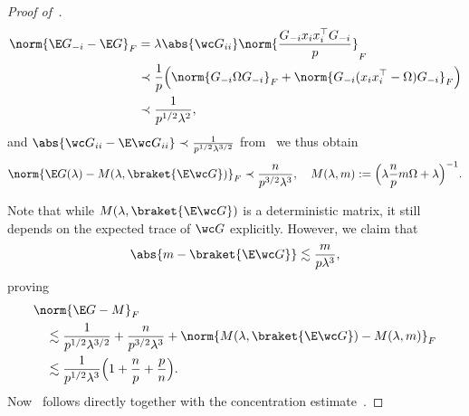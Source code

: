 \begin{proof}[Proof of~]
\begin{equation}
    \begin{aligned}
    \norm{\E G_{-i} - \E G}_F  &= \lambda\abs{\wc G_{ii}}\norm{\frac{G_{-i}x_i x_i^\top G_{-i}}{p}}_F \\
    &\prec \frac{1}{p}\Bigl(\norm{G_{-i}\Omega G_{-i}}_F + \norm{G_{-i} (x_ix_i^\top-\Omega)G_{-i} }_F\Bigr)\\
    &\prec \frac{1}{p^{1/2}\lambda^2},
    \end{aligned}
\end{equation}
and $\abs{\wc G_{ii}-\E \wc G_{ii}} \prec \frac{1}{p^{1/2}\lambda^{3/2}}$ from~
we thus obtain
\begin{equation}
    \norm{\E G(\lambda) - M(\lambda,\braket{\E\wc G})}_F \prec \frac{n}{p^{3/2}\lambda^3},\quad M(\lambda,m):=\Bigl( \lambda\frac{n}{p}m\Omega + \lambda\Bigr)^{-1}.
\end{equation}

Note that while $M(\lambda,\braket{\E \wc G})$ is a deterministic matrix, it still depends on the expected trace of $\wc G$ explicitly. However, we claim that
\begin{equation}\label{scalar claim}
    \abs{m-\braket{\E\wc G}} \lesssim \frac{m}{p\lambda^3},
\end{equation}
proving
\begin{equation}\label{local law G}
    \begin{aligned}
    &\norm{\E G - M}_F \\
    &\quad \lesssim \frac{1}{p^{1/2}\lambda^{3/2}} + \frac{n}{p^{3/2}\lambda^3} + \norm{M(\lambda,\braket{\E\wc G})-M(\lambda,m)}_F \\
    &\quad \lesssim \frac{1}{p^{1/2}\lambda^{3}}\Bigl(1+\frac{n}{p}+\frac{p}{n}\Bigr).
    \end{aligned}
\end{equation}
Now~ follows directly together with the concentration estimate~. 
\end{proof}

